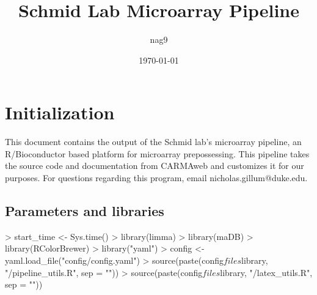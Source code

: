 \documentclass[titlepage]{article}
\begin{document}
\author{nag9}
\title{Schmid Lab Microarray Pipeline}
\date{\today}

\maketitle
\tableofcontents
\listoffigures
\pagebreak

\section{Initialization}
This document contains the output of the Schmid lab's microarray pipeline, an 
R/Bioconductor based platform for microarray prepossessing. This pipeline takes 
the source code and documentation from CARMAweb and customizes it for our 
purposes. For questions regarding this program, email nicholas.gillum@duke.edu.

\subsection{Parameters and libraries}
\begin{Schunk}
\begin{Sinput}
> start_time <- Sys.time()
> library(limma)
> library(maDB)
> library(RColorBrewer)
> library("yaml")
> config <- yaml.load_file("config/config.yaml")
> source(paste(config$files$library, "/pipeline_utils.R", sep = ""))
> source(paste(config$files$library, "/latex_utils.R", sep = ""))
\end{Sinput}
\end{Schunk}
\end{document}
